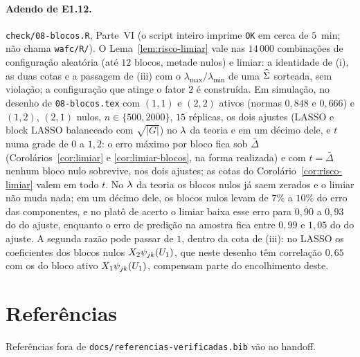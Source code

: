 \documentclass[11pt,a4paper]{article}
\newcommand{\lmin}{\lambda_{\min}}
\newcommand{\lmaxx}{\lambda_{\max}}
\begin{document}
\paragraph{Adendo de E1.12.} \texttt{check/08-blocos.R}, Parte~VI (o
script inteiro imprime \texttt{OK} em cerca de $5$~min; não chama
\texttt{wafc/R/}). O Lema~\ref{lem:risco-limiar} vale nas $14\,000$
combinações de configuração aleatória (até $12$ blocos, metade nulos) e
limiar: a identidade de (i), as duas cotas e a passagem de (iii) com o
$\lmaxx/\lmin$ de uma $\widehat{\Sigma}$ sorteada, sem violação; a configuração que
atinge o fator $2$ é construída. Em simulação, no desenho de
\texttt{08-blocos.tex} com $(1,1)$ e $(2,2)$ ativos (normas $0{,}848$ e
$0{,}666$) e $(1,2)$, $(2,1)$ nulos, $n \in \{500, 2000\}$, $15$ réplicas, os
dois ajustes (LASSO e block LASSO balanceado com $\sqrt{|G|}$) no $\lambda$ da
teoria e em um décimo dele, e $t$ numa grade de $0$ a $1{,}2$: o erro máximo
por bloco fica sob $\bar\Delta$ (Corolários~\ref{cor:limiar} e
\ref{cor:limiar-blocos}, na forma realizada) e com $t = \bar\Delta$ nenhum
bloco nulo sobrevive, nos dois ajustes; as cotas do
Corolário~\ref{cor:risco-limiar} valem em todo $t$. No $\lambda$ da teoria os
blocos nulos já saem zerados e o limiar não muda nada; em um décimo dele, os
blocos nulos levam de $7\%$ a $10\%$ do erro das componentes, e no platô de
acerto o limiar baixa esse erro para $0{,}90$ a $0{,}93$ do do ajuste,
enquanto o erro de predição na amostra fica entre $0{,}99$ e $1{,}05$ do do
ajuste. A segunda razão pode passar de $1$, dentro da cota de (iii): no
LASSO os coeficientes dos blocos nulos $X_{2}\psi_{jk}(U_{1})$, que
neste desenho têm correlação $0{,}65$ com os do bloco ativo
$X_{1}\psi_{jk}(U_{1})$, compensam parte do encolhimento deste.

\section*{Referências}
\sloppy

Referências fora de \texttt{docs/referencias-verificadas.bib} vão ao handoff.
\end{document}
